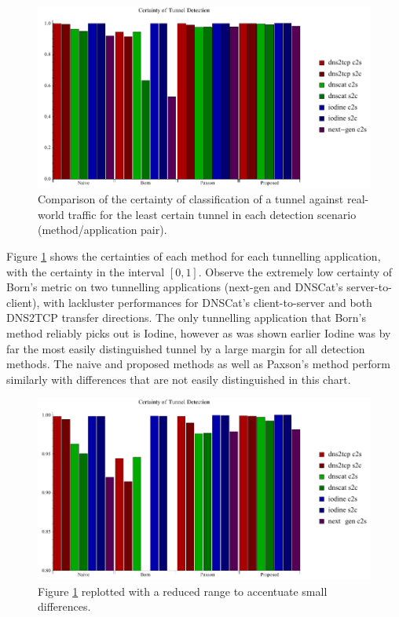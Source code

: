 \documentclass[12pt]{report}
\theoremstyle{remark}
\theoremstyle{definition}
\theoremstyle{definition}
\theoremstyle{definition}
\begin{document}
\begin{figure}
\centering
\includegraphics[width=\textwidth]{figures/cplot.pdf}
\caption[Chart of Certainty of Detection by Tunnel Application and Detection
Method]{Comparison of the certainty of classification of a tunnel against
real-world traffic for the least certain tunnel in each detection scenario
(method/application pair).}
\label{cplot}
\end{figure}

Figure \ref{cplot} shows the certainties of each method for each tunnelling
application, with the certainty in the interval $[0,1]$. Observe the extremely
low certainty of Born's metric on two tunnelling applications (next-gen and
DNSCat's server-to-client), with lackluster performances for DNSCat's
client-to-server and both DNS2TCP transfer directions. The only tunnelling
application that Born's method reliably picks out is Iodine, however as was
shown earlier Iodine was by far the most easily distinguished tunnel by a large
margin for all detection methods. The naive and proposed methods as well as
Paxson's method perform similarly with differences that are not easily
distinguished in this chart.

\begin{figure}
\centering
\includegraphics[width=\textwidth]{figures/cplot2.pdf}
\caption[Chart of Certainty of Detection by Tunnel Application and Detection
Method - 0.80 to 1.00]{Figure \ref{cplot} replotted with a reduced range to
accentuate small differences.}
\label{cplot80}
\end{figure}
\end{document}
